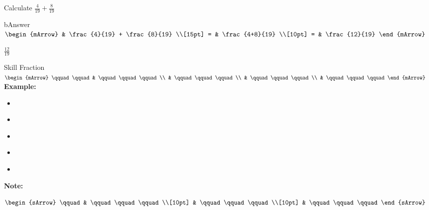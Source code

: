 \begin{mtask}
   \task \begin{exercise} Calculate $ \frac{4}{19} + \frac{8}{19} $
           \begin{envOut}[height=6cm]{bAnswer}
             $\begin{mArrow} 
			       & \frac{4}{19} +  \frac{8}{19}             \\[15pt]
                 = & \frac{4+8}{19}                          \\[10pt]
		   		 = & \frac{12}{19}
              \end{mArrow}$
            \begin{shortsolution}  
			     $\frac{12}{19}$
			\end{shortsolution}				 
           \end{envOut}
         \end{exercise}
\end{mtask}

\clearpage\noindent%
\begin{boxSkill}{Skill \thenskill \quad Fraction }
    \noindent%
	 $\begin{mArrow}
        \qquad \qquad & \qquad\qquad\qquad \\
                      & \qquad\qquad\qquad \\
			          & \qquad\qquad\qquad \\
			          & \qquad\qquad\qquad
 	 \end{mArrow}$\\[0.5cm]
	 

	\textbf{Example:}
	\begin{itemize}[leftmargin=0.8cm]
	     \item[] $\qquad\qquad\qquad    $
	     \item[] $\qquad\qquad\qquad    $
	     \item[] $\qquad\qquad\qquad    $ 
	     \item[] $\qquad\qquad\qquad    $
	     \item[] $\qquad\qquad\qquad    $	 
	\end{itemize}
	
	\tcbline
	
    \textbf{Note:}\\[0.6cm]
	\begin{warningEnv}
	    $\begin{sArrow}
	        \qquad   & \qquad\qquad\qquad \\[10pt]
	  	             & \qquad\qquad\qquad \\[10pt] 
                     & \qquad\qquad\qquad 				   
		 \end{sArrow}$		   
    \end{warningEnv}
\end{boxSkill}

